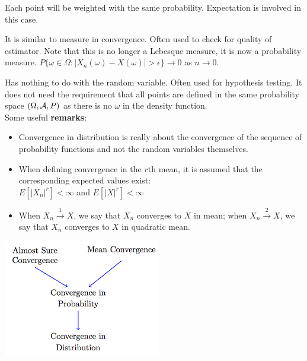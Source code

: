 Each point will be weighted with the same probability. Expectation is involved in this case.

It is similar to measure in convergence. Often used to check for quality of estimator.
Note that this is no longer a Lebesque measure, it is now a probability measure. 
$P\{\omega\in\Omega : |X_n(\omega)-X(\omega)|>\epsilon\}\to 0$ as $n\to 0$.

Has nothing to do with the random variable. Often used for hypothesis testing.
It does not need the requirement that all points are defined in the same probability space $(\Omega, \mathcal{A}, P)$
as there is no $\omega$ in the density function.\\

Some useful \textbf{remarks}:
\begin{itemize}
    \item Convergence in distribution is really about the convergence of the sequence of probability functions and not the random variables themselves.
    \item When defining convergence in the $r$th mean, it is assumed that the corresponding expected values exist:\\
    $E[|X_n|^r]<\infty$ and $E[|X|^r]<\infty$
    \item When $X_n\xrightarrow{1}X$, we say that $X_n$ converges to $X$ in mean;
    when $X_n\xrightarrow{2}X$, we say that $X_n$ converges to $X$ in quadratic mean.
\end{itemize}

\begin{center}
    \includegraphics[scale=0.5]{Images/2.png}
\end{center}

